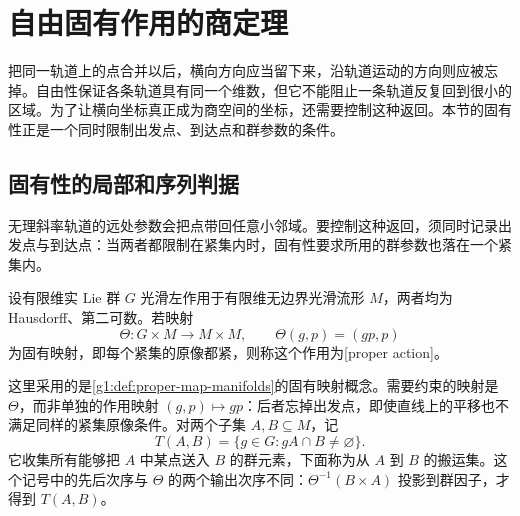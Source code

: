 
% 
% 

\section{自由固有作用的商定理}
\label{g1:sec:1702}

把同一轨道上的点合并以后，横向方向应当留下来，沿轨道运动的方向则应被忘掉。自由性保证各条轨道具有同一个维数，但它不能阻止一条轨道反复回到很小的区域。为了让横向坐标真正成为商空间的坐标，还需要控制这种返回。本节的固有性正是一个同时限制出发点、到达点和群参数的条件。

\subsection{固有性的局部和序列判据}
\label{g1:subsec:1702:01}

无理斜率轨道的远处参数会把点带回任意小邻域。要控制这种返回，须同时记录出发点与到达点：当两者都限制在紧集内时，固有性要求所用的群参数也落在一个紧集内。

\begin{definition}\label{g1:def:proper-lie-group-action}
	设有限维实 Lie 群 \(G\) 光滑左作用于有限维无边界光滑流形 \(M\)，两者均为 Hausdorff、第二可数。若映射
	\[
		\Theta:G\times M\longrightarrow M\times M,\qquad
		\Theta(g,p)=(gp,p)
	\]
	为固有映射，即每个紧集的原像都紧，则称这个作用为[proper action]。
\end{definition}

这里采用的是\cref{g1:def:proper-map-manifolds}的固有映射概念。需要约束的映射是 \(\Theta\)，而非单独的作用映射 \((g,p)\mapsto gp\)：后者忘掉出发点，即使直线上的平移也不满足同样的紧集原像条件。对两个子集 \(A,B\subseteq M\)，记
\[
	T(A,B)=\{g\in G:gA\cap B\ne\varnothing\}.
\]
它收集所有能够把 \(A\) 中某点送入 \(B\) 的群元素，下面称为从 \(A\) 到 \(B\) 的搬运集。这个记号中的先后次序与 \(\Theta\) 的两个输出次序不同：\(\Theta^{-1}(B\times A)\) 投影到群因子，才得到 \(T(A,B)\)。


